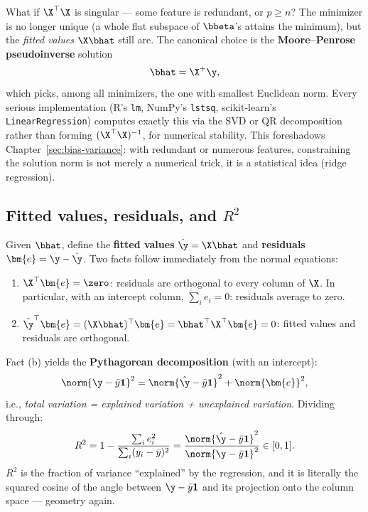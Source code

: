 What if $\X^\top \X$ is singular — some feature is redundant, or $p \geq n$? The minimizer is no longer unique (a whole flat subspace of $\bbeta$'s attains the minimum), but the \emph{fitted values} $\X \bhat$ still are. The canonical choice is the \textbf{Moore--Penrose pseudoinverse} solution
\[
  \bhat = \X^{+} \y,
\]
which picks, among all minimizers, the one with smallest Euclidean norm. Every serious implementation (R's \texttt{lm}, NumPy's \texttt{lstsq}, scikit-learn's \texttt{LinearRegression}) computes exactly this via the SVD or QR decomposition rather than forming $(\X^\top\X)^{-1}$, for numerical stability. This foreshadows Chapter~\ref{sec:bias-variance}: with redundant or numerous features, constraining the solution norm is not merely a numerical trick, it is a statistical idea (ridge regression).

\subsection{Fitted values, residuals, and $R^2$}

Given $\bhat$, define the \textbf{fitted values} $\hat{\y} = \X \bhat$ and \textbf{residuals} $\bm{e} = \y - \hat{\y}$. Two facts follow immediately from the normal equations:

\begin{enumerate}[label=(\alph*)]
  \item $\X^\top \bm{e} = \zero$: residuals are orthogonal to every column of $\X$. In particular, with an intercept column, $\sum_i e_i = 0$: residuals average to zero.
  \item $\hat{\y}^\top \bm{e} = (\X \bhat)^\top \bm{e} = \bhat^\top \X^\top \bm{e} = 0$: fitted values and residuals are orthogonal.
\end{enumerate}

Fact (b) yields the \textbf{Pythagorean decomposition} (with an intercept):
\[
  \norm{\y - \bar{y} \mathbf{1}}^2
  = \norm{\hat{\y} - \bar{y} \mathbf{1}}^2 + \norm{\bm{e}}^2,
\]
i.e., \emph{total variation = explained variation + unexplained variation}. Dividing through:
\begin{equation}\label{eq:r2}
  R^2 = 1 - \frac{\sum_i e_i^2}{\sum_i (y_i - \bar{y})^2}
      = \frac{\norm{\hat{\y} - \bar{y}\mathbf{1}}^2}{\norm{\y - \bar{y}\mathbf{1}}^2} \in [0, 1].
\end{equation}
$R^2$ is the fraction of variance ``explained'' by the regression, and it is literally the squared cosine of the angle between $\y - \bar{y}\mathbf{1}$ and its projection onto the column space — geometry again.

